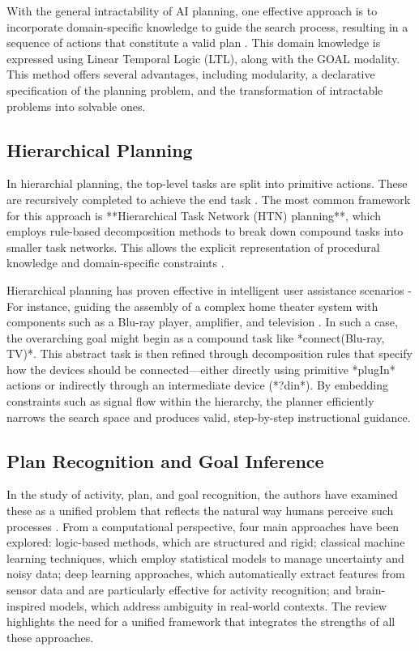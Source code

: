 \documentclass[a4paper,11pt]{lmcs}
\begin{document}
With the general intractability of AI planning, one effective approach is to incorporate domain-specific knowledge to guide the search process, resulting in a sequence of actions that constitute a valid plan \citep{Bacchus2000}. This domain knowledge is expressed using Linear Temporal Logic (LTL), along with the GOAL modality. This method offers several advantages, including modularity, a declarative specification of the planning problem, and the transformation of intractable problems into solvable ones.
\subsection*{Hierarchical Planning}
In hierarchial planning, the top-level tasks are split into primitive actions. These are recursively completed to achieve the end task \cite{hplan2}. The most common framework for this approach is **Hierarchical Task Network (HTN) planning**, which employs rule-based decomposition methods to break down compound tasks into smaller task networks. This allows the explicit representation of procedural knowledge and domain-specific constraints \cite{htn1}.

Hierarchical planning has proven effective in intelligent user assistance scenarios -For instance, guiding the assembly of a complex home theater system with components such as a Blu-ray player, amplifier, and television \cite{hplan1}. In such a case, the overarching goal might begin as a compound task like *connect(Blu-ray, TV)*. This abstract task is then refined through decomposition rules that specify how the devices should be connected—either directly using primitive *plugIn* actions or indirectly through an intermediate device (*?din*). By embedding constraints such as signal flow within the hierarchy, the planner efficiently narrows the search space and produces valid, step-by-step instructional guidance.
\subsection*{Plan Recognition and Goal Inference}
In the study of activity, plan, and goal recognition, the authors have examined these as a unified problem that reflects the natural way humans perceive such processes \citep{goal_act_plan}. From a computational perspective, four main approaches have been explored: logic-based methods, which are structured and rigid; classical machine learning techniques, which employ statistical models to manage uncertainty and noisy data; deep learning approaches, which automatically extract features from sensor data and are particularly effective for activity recognition; and brain-inspired models, which address ambiguity in real-world contexts. The review highlights the need for a unified framework that integrates the strengths of all these approaches.
\end{document}
